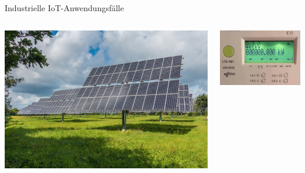 \begin{frame}[allowframebreaks]{Industrielle IoT-Anwendungsfälle}
    \begin{columns}
        \begin{column}[b]{.45\textwidth}
            \begin{center}
                \includegraphics[width=\textwidth]{img/iiot-energie}
            \end{center}
        \end{column}
        \begin{column}[b]{.45\textwidth}
            \begin{center}
                \includegraphics[width=\textwidth]{img/iiot-smartmeter}
            \end{center}
        \end{column}
    \end{columns}

    \framebreak


\end{frame}
